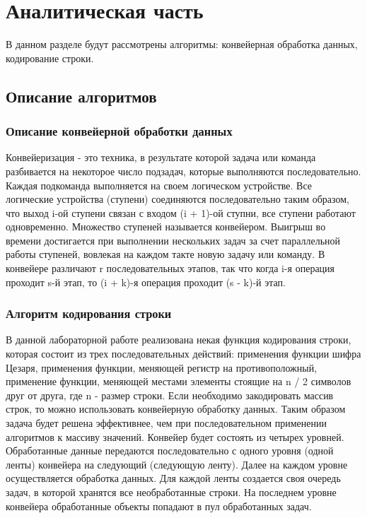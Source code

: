 \chapter{Аналитическая часть}
В данном разделе будут рассмотрены алгоритмы: конвейерная обработка данных, кодирование строки.

\section{Описание алгоритмов}

\subsection{Описание конвейерной обработки данных}

Конвейеризация\cite{conveyor} - это техника, в результате которой задача или команда разбивается на некоторое число подзадач, которые выполняются последовательно. Каждая подкоманда выполняется на своем логическом устройстве. Все логические устройства (ступени) соединяются последовательно таким образом, что выход i-ой ступени связан с входом (i + 1)-ой ступни, все ступени работают одновременно. Множество ступеней называется конвейером. Выигрыш во времени достигается при выполнении нескольких задач за счет параллельной работы ступеней, вовлекая на каждом такте новую задачу или команду.  
В конвейере различают r последовательных этапов, так что когда i-я операция проходит s-й этап, то (i + k)-я операция проходит (s - k)-й этап.

\subsection{Алгоритм кодирования строки}
В данной лабораторной работе реализована некая функция кодирования строки, которая состоит из трех последовательных действий: применения функции шифра Цезаря\cite{ceusar}, применения функции, меняющей регистр на противоположный, применение функции, меняющей местами элементы стоящие на n / 2 символов друг от друга, где n - размер строки.
Если необходимо закодировать массив строк, то можно использовать конвейерную обработку данных. Таким образом задача будет решена эффективнее, чем при последовательном применении алгоритмов к массиву значений.  
Конвейер будет состоять из четырех уровней. Обработанные данные передаются последовательно с одного уровня (одной ленты) конвейера на следующий (следующую ленту). Далее на каждом  уровне осуществляется обработка данных. Для каждой ленты создается своя очередь задач, в которой хранятся все необработанные строки. На последнем уровне конвейера обработанные объекты попадают в пул обработанных задач.  

